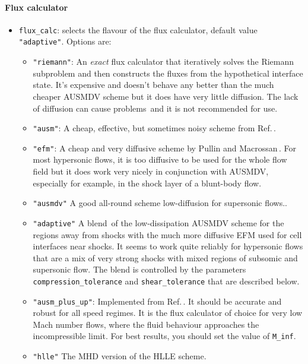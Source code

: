 \paragraph{Flux calculator}
\begin{itemize}
\item \texttt{flux\_calc}: selects the flavour of the flux calculator, 
  default value \verb!"adaptive"!. 
  Options are:
  \begin{itemize}
   \item \verb!"riemann"!: An \textit{exact} flux calculator that iteratively solves the Riemann subproblem
    and then constructs the fluxes from the hypothetical interface state.  It's expensive and doesn't behave
    any better than the much cheaper AUSMDV scheme but it does have very little diffusion.  
    The lack of diffusion can cause problems\,\cite{quirk_94a} and it is not recommended for use.
   \item \verb!"ausm"!: A cheap, effective, but sometimes noisy scheme from Ref.\,\cite{liou_steffen_91b}.
   \item \verb!"efm"!: A cheap and very diffusive scheme by Pullin and Macrossan\,\cite{pullin_80,macrossan_89}.
    For most hypersonic flows, it is too diffusive to be used for the whole flow field 
    but it does work very nicely in conjunction with AUSMDV, 
    especially for example, in the shock layer of a blunt-body flow.
   \item \verb!"ausmdv"! A good all-round scheme low-diffusion for supersonic flows.\cite{wada_liou_94a}.
   \item \verb!"adaptive"! A blend\,\cite{quirk_94a} of the low-dissipation AUSMDV scheme 
     for the regions away from shocks
     with the much more diffusive EFM used for cell interfaces near shocks.  
     It seems to work quite reliably for hypersonic flows that are a mix of very strong shocks with
     mixed regions of subsomic and supersonic flow.
     The blend is controlled by the parameters \verb!compression_tolerance! and \verb!shear_tolerance!
     that are described below.
   \item \verb!"ausm_plus_up"!: Implemented from Ref.\,\cite{liou_2006a}.
     It should be accurate and robust for all speed regimes.  
     It is the flux calculator of choice for very low Mach number flows,
     where the fluid behaviour approaches the incompressible limit.
     For best results, you should set the value of \verb!M_inf!.
   \item \verb!"hlle"! The MHD version of the HLLE scheme.
  \end{itemize}  

\end{itemize}

